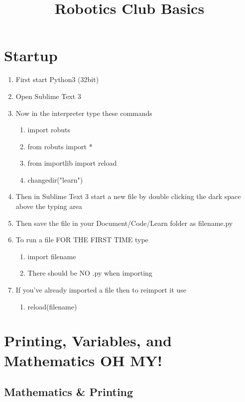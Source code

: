\documentclass{article}
\title{Robotics Club Basics}
\begin{document}
\section{Startup}
\begin{enumerate}
	\item First start Python3 (32bit)
    \item Open Sublime Text 3
    \item Now in the interpreter type these commands
    \begin{enumerate}
    	\item import robuts
        \item from robuts import *
        \item from importlib import reload
        \item changedir("learn")
   \end{enumerate}

   \item Then in Sublime Text 3 start a new file by double clicking the dark space above the typing area
   \item Then save the file in your Document/Code/Learn folder as filename.py
   \item To run a file FOR THE FIRST TIME type
  \begin{enumerate}
      \item import filename
      \item There should be NO .py when importing
   \end{enumerate}
   \item If you've already imported a file then to reimport it use
   \begin{enumerate}
		\item reload(filename)
   \end{enumerate}
\end{enumerate}	

\section{Printing, Variables, and Mathematics OH MY!}
\subsection{Mathematics \& Printing}
\end{document}
